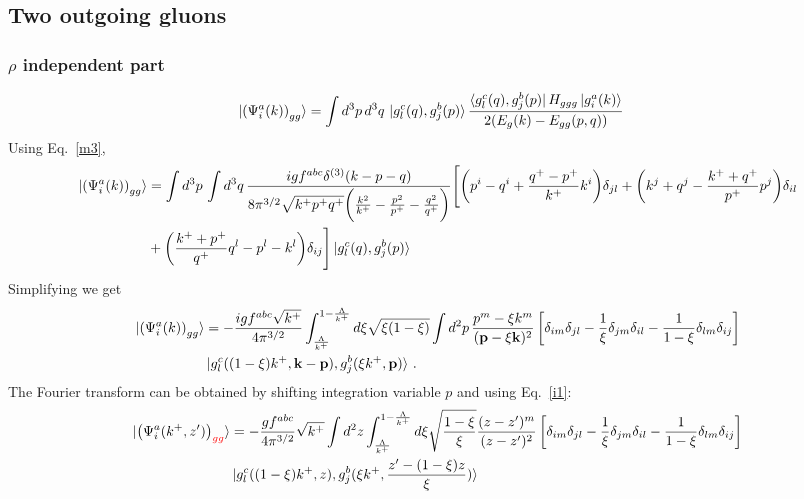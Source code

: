 \documentclass[aps,prd,amsmath,amssymb,nofootinbib]{revtex4-2}
\def\v#1{\mathbf{#1}}
\numberwithin{equation}{section}
\begin{document}
\subsection{Two outgoing gluons}   
\subsubsection{$\rho$ independent part}
\begin{figure}[h]
\end{figure}
\begin{align}\label{rhoindep}
  \ket{ \left(\Psi^{a}_{i}(k) \right)_{gg} } & =
   \int d^{3}p\, d^{3}q \, 
   \ket{g^{c}_{l}(q),g^{b}_{j}(p)}
   \frac{\bra{g^{c}_{l}(q),g^{b}_{j}(p)} H_{ggg} \ket{g^{a}_{i}(k)}}{2(E_g(k)-E_{gg}(p,q))}
\end{align}
Using Eq.~\eqref{m3}, 
\begin{align}
 \ket{ \left(\Psi^{a}_{i}(k) \right)_{gg} } & = \int d^{3}p\,\int d^{3}q\,\frac{igf^{abc}\delta^{(3)}(k-p-q)}{8\pi^{3/2}\sqrt{k^{+}p^{+}q^{+}}\bigg(\frac{k^{2}}{k^{+}}-\frac{p^{2}}{p^{+}}-\frac{q^{2}}{q^{+}}\bigg)}\Bigg[\bigg(p^{i}-q^{i}+\frac{q^{+}-p^{+}}{k^{+}}k^{i}\bigg)\delta_{jl}+\bigg(k^{j}+q^{j}-\frac{k^{+}+q^{+}}{p^{+}}p^{j}\bigg)\delta_{il}\notag \\ & +\bigg(\frac{k^{+}+p^{+}}{q^{+}}q^{l}-p^{l}-k^{l}\bigg)\delta_{ij}\Bigg]  \ket{g^{c}_{l}(q),g^{b}_{j}(p)}
 \end{align}
 Simplifying we get 
 \begin{align}
\ket{ \left(\Psi^{a}_{i}(k) \right)_{gg} } &  = -\frac{ i g f^{abc}\sqrt{k^+}} {4\pi^{3/2}} 
  \int_{ \frac{\Lambda}{k^+} }^{1 -  \frac{\Lambda}{k^+} } d\xi  \sqrt{\xi (1-\xi)} 
   \int d^{2}p\,  
   \frac{p^m - \xi k^m  }{( \v{p}- \xi \v{k} )^2 } \left[ \delta_{im} \delta_{jl}
     - \frac{1}{\xi}\delta_{jm} \delta_{il}
   - \frac{1}{1-\xi} \delta_{lm}\delta_{ij}
 \right]\notag \\ & 
 \ket{g^{c}_{l}((1-\xi)k^+,\v{k}-\v{p}),g^{b}_{j}(\xi k^+,\v{p})} 
 \,.
\end{align}
The Fourier transform can be obtained by shifting integration variable $p$ and using Eq.~\eqref{i1}: 
\begin{align}\label{gindeppos}
    \ket{\left(\Psi^{a}_{i}(k^{+},z^{\prime})\right)_{{\color{red}gg}}} & =  - \frac{g f^{abc}}{4\pi^{3/2}}\sqrt{k^+} \int d^2 z \int_{ \frac{\Lambda}{k^+} }^{1 -  \frac{\Lambda}{k^+} }  d\xi \sqrt{\frac{1-\xi} {\xi} }  \frac{(z-z^{\prime})^{m}}{(z-z^{\prime})^{2}}  \left[ \delta_{im} \delta_{jl}
     -\frac{1}{\xi}\delta_{jm} \delta_{il}
   -\frac{1}{1-\xi} \delta_{lm} \delta_{ij}
 \right] \notag \\ & \ket{g^{c}_{l}((1-\xi)k^{+},z),g^{b}_{j}(\xi k^{+},\frac{z^{\prime}-(1-\xi)z}{\xi})}
\end{align}
\end{document}
